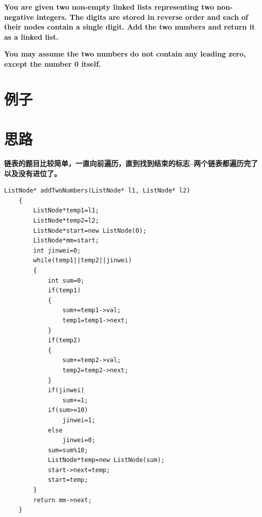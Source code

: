 \documentclass[a4paper, 11pt]{article} %
\begin{document}
\begin{spacing}{1.5}
{{  \textbf{You are given two non-empty linked lists representing two non-negative integers. The digits are stored in reverse order and each of their nodes contain a single digit. Add the two numbers and return it as a linked list.}

  \textbf{You may assume the two numbers do not contain any leading zero, except the number 0 itself.}
  }
  }
  \section*{例子}

\section*{思路}
\textbf{\color{blue}链表的题目比较简单，一直向前遍历，直到找到结束的标志--两个链表都遍历完了以及没有进位了。}
\begin{lstlisting}[caption={},frame=shadowbox]
    ListNode* addTwoNumbers(ListNode* l1, ListNode* l2)
    {
        ListNode*temp1=l1;
        ListNode*temp2=l2;
        ListNode*start=new ListNode(0);
        ListNode*mm=start;
        int jinwei=0;
        while(temp1||temp2||jinwei)
        {
            int sum=0;
            if(temp1)
            {
                sum+=temp1->val;
                temp1=temp1->next;
            }
            if(temp2)
            {
                sum+=temp2->val;
                temp2=temp2->next;
            }
            if(jinwei)
                sum+=1;
            if(sum>=10)
                jinwei=1;
            else
                jinwei=0;
            sum=sum%10;
            ListNode*temp=new ListNode(sum);
            start->next=temp;
            start=temp;
        }
        return mm->next;
    }
\end{lstlisting}



\end{spacing}
\end{document}
